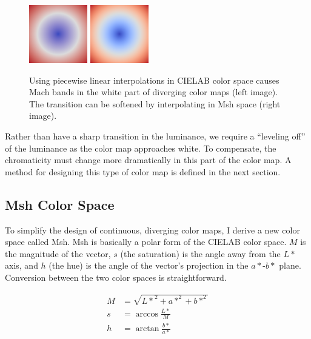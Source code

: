 \documentclass[review,journal]{vgtc}         %
\newcommand{\Lab}{CIELAB\xspace}
\newcommand{\Msh}{Msh\xspace}
\begin{document}
\begin{figure}
  \centering
  \includegraphics[width=1in]{images/Cool2WarmLabRadial}
  \qquad
  \includegraphics[width=1in]{images/Cool2WarmRadial}
  \caption{Using piecewise linear interpolations in \Lab color space causes
    Mach bands in the white part of diverging color maps (left image).  The
    transition can be softened by interpolating in \Msh space (right image).}
  \label{fig:LinearMachBands}
\end{figure}

Rather than have a sharp transition in the luminance, we require a
``leveling off'' of the luminance as the color map approaches white.  To
compensate, the chromaticity must change more dramatically in this part of
the color map.  A method for designing this type of color map is defined in
the next section.

\subsection{\Msh Color Space}
\label{sec:MshColorSpace}

To simplify the design of continuous, diverging color maps, I derive a new
color space called \Msh.  \Msh is basically a polar form of the \Lab color
space.  $M$ is the magnitude of the vector, $s$ (the saturation) is the
angle away from the $L*$ axis, and $h$ (the hue) is the angle of the
vector's projection in the $a*$-$b*$ plane.  Conversion between the two
color spaces is straightforward.

\begin{equation}
  \begin{split}
    M &= \sqrt{{L*}^2 + a*^2 + b*^2} \\
    s &= \arccos \frac{L*}{M} \\
    h &= \arctan \frac{b*}{a*}
  \end{split}
  \label{eqn:LabToMsh}
\end{equation}
\end{document}
